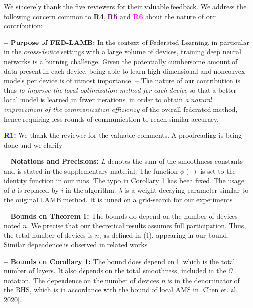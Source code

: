 \documentclass{article}
\begin{document}
We sincerely thank the five reviewers for their valuable feedback. 
We address the following concern common to \textbf{\textcolor{green!50!black}{R4}}, \textbf{\textcolor{purple}{R5}} and \textbf{\textcolor{magenta}{R6}} about the nature of our contribution:\vspace{-1pt}

\textbf{-- Purpose of FED-LAMB:} 
In the context of Federated Learning, in particular in the \emph{cross-device} settings with a large volume of devices, training deep neural networks is a burning challenge.
Given the potentially cumbersome amount of data present in each device, being able to learn high dimensional and nonconvex models per device is of utmost importance.
-- The nature of our contribution is thus \emph{to improve the local optimization method for each device} so that a better local model is learned in fewer iterations, in order to obtain \emph{a natural improvement of the communication efficiency} of the overall federated method, hence requiring less rounds of communication to reach similar accuracy.


 \vspace{1pt}
\textbf{\textcolor{blue}{R1:}} We thank the reviewer for the valuable comments. A proofreading is being done and we clarify:\vspace{-1pt}

\textbf{-- Notations and Precisions:} 
$\bar{L}$ denotes the sum of the smoothness constants and is stated in the supplementary material. 
The function $\phi(\cdot)$ is set to the identity function in our runs. 
The typo in Corollary 1 has been fixed.
The usage of $d$ is replaced by $i$ in the algorithm.
$\lambda$ is a weight decaying parameter similar to the original LAMB method. It is tuned on a grid-search for our experiments.

\vspace{-0.5pt}
\textbf{-- Bounds on Theorem 1:} The bounds do depend on the number of devices noted $n$.
We precise that our theoretical results assumes full participation. Thus, the total number of devices is $n$, as defined in (1), appearing in our bound.
Similar dependence is observed in related works.
 
 \vspace{-0.5pt}
\textbf{-- Bounds on Corollary 1:} 
The bound does depend on $\mathsf{L}$ which is the total number of layers. 
It also depends on the total smoothness, included in the $\mathcal{O}$ notation.
The dependence on the number of devices $n$ is in the denominator of the RHS, which is in accordance with the bound of local AMS in [Chen et. al. 2020].
\end{document}
